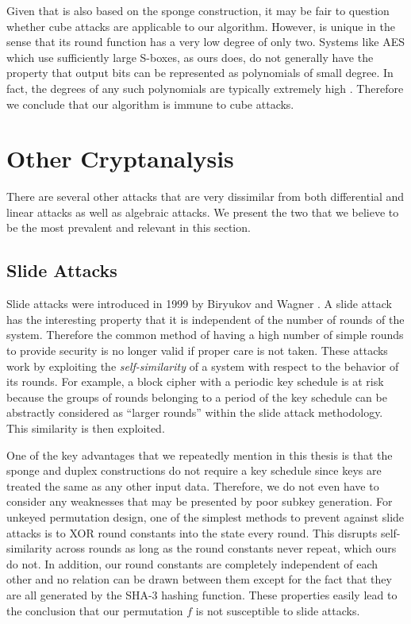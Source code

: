 Given that \Keccak is also based on the sponge construction, it may be fair to question whether cube attacks are applicable to our algorithm.
However, \Keccak is unique in the sense that its round function has a very low degree of only two.
Systems like AES which use sufficiently large S-boxes, as ours does, do not generally have the property that output bits can be represented as polynomials of small degree.
In fact, the degrees of any such polynomials are typically extremely high \cite{Schneier2008_CubeAttacks}.
Therefore we conclude that our algorithm is immune to cube attacks.

\section{Other Cryptanalysis}
There are several other attacks that are very dissimilar from both differential and linear attacks as well as algebraic attacks.
We present the two that we believe to be the most prevalent and relevant in this section.

\subsection{Slide Attacks}
Slide attacks were introduced in 1999 by Biryukov and Wagner \cite{Biryukov1999_SlideAttacks}.
A slide attack has the interesting property that it is independent of the number of rounds of the system.
Therefore the common method of having a high number of simple rounds to provide security is no longer valid if proper care is not taken.
These attacks work by exploiting the \emph{self-similarity} of a system with respect to the behavior of its rounds.
For example, a block cipher with a periodic key schedule is at risk because the groups of rounds belonging to a period of the key schedule can be abstractly considered as ``larger rounds'' within the slide attack methodology.
This similarity is then exploited.

One of the key advantages that we repeatedly mention in this thesis is that the sponge and duplex constructions do not require a key schedule since keys are treated the same as any other input data.
Therefore, we do not even have to consider any weaknesses that may be presented by poor subkey generation.
For unkeyed permutation design, one of the simplest methods to prevent against slide attacks is to XOR round constants into the state every round.
This disrupts self-similarity across rounds as long as the round constants never repeat, which ours do not.
In addition, our round constants are completely independent of each other and no relation can be drawn between them except for the fact that they are all generated by the SHA-3 hashing function.
These properties easily lead to the conclusion that our permutation $f$ is not susceptible to slide attacks.

